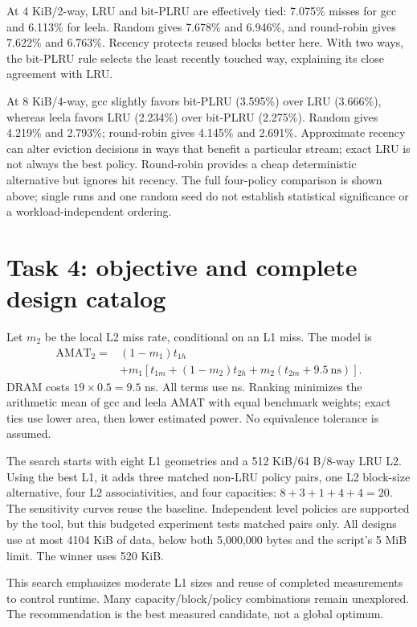 \documentclass[10pt,letterpaper]{article}
\begin{document}
At 4 KiB/2-way, LRU and bit-PLRU are effectively tied: 7.075\% misses for gcc
and 6.113\% for leela. Random gives 7.678\% and 6.946\%, and round-robin gives
7.622\% and 6.763\%. Recency protects reused blocks better here. With two ways,
the bit-PLRU rule selects the least recently touched way, explaining its close
agreement with LRU.

At 8 KiB/4-way, gcc slightly favors bit-PLRU (3.595\%) over LRU (3.666\%),
whereas leela favors LRU (2.234\%) over bit-PLRU (2.275\%). Random gives
4.219\% and 2.793\%; round-robin gives 4.145\% and 2.691\%. Approximate recency can alter eviction decisions in ways
that benefit a particular stream; exact LRU is not always the best policy.
Round-robin provides a cheap deterministic alternative but ignores hit recency.
The full four-policy comparison is shown above; single runs and one random seed
do not establish statistical significance or a workload-independent ordering.

\clearpage
\section{Task 4: objective and complete design catalog}
Let $m_2$ be the local L2 miss rate, conditional on an L1 miss. The model is
\begin{align}
\mathrm{AMAT}_2={}&(1-m_1)t_{1h}\\
&+m_1\left[t_{1m}+(1-m_2)t_{2h}+m_2(t_{2m}+9.5\ \mathrm{ns})\right].
\end{align}
DRAM costs $19\times0.5=9.5$ ns. All terms use ns. Ranking minimizes the
arithmetic mean of gcc and leela AMAT with equal benchmark weights; exact ties
use lower area, then lower estimated power. No equivalence tolerance is assumed.

The search starts with eight L1 geometries and a 512 KiB/64 B/8-way LRU L2.
Using the best L1, it adds three matched non-LRU policy pairs, one L2 block-size
alternative, four L2 associativities, and four capacities: $8+3+1+4+4=20$.
The sensitivity curves reuse the baseline. Independent level policies are
supported by the tool, but this budgeted experiment tests matched pairs only.
All designs use at most 4104 KiB of data, below both 5,000,000 bytes and the
script's 5 MiB limit. The winner uses 520 KiB.
\begin{table}[H]\centering\small
\caption{All 20 measured designs. C/B/A/P denotes KiB, block bytes, ways, and policy; L=LRU, R=random, P=bit-PLRU, RR=round-robin. AMAT is in ns, area in mm$^2$, power in mW.}

\end{table}
This search emphasizes moderate L1 sizes and reuse of completed measurements
to control runtime. Many capacity/block/policy combinations remain unexplored.
The recommendation is the best measured candidate, not a global optimum.
\end{document}
